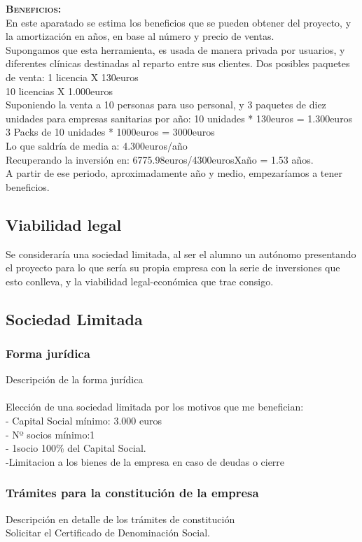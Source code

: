 \textbf{\textsc{Beneficios:}}\\
En este aparatado se estima los beneficios que se pueden obtener del proyecto, y la amortización en años, en base al número y precio de ventas.\\
Supongamos que esta herramienta, es usada de manera privada por usuarios, y diferentes clínicas destinadas al reparto entre sus clientes.
Dos posibles paquetes de venta:
1 licencia X 130euros\\
10 licencias X 1.000euros\\
Suponiendo la venta a 10 personas para uso personal, y 3 paquetes de diez unidades para empresas sanitarias por año:
10 unidades * 130euros = 1.300euros\\
3 Packs de 10 unidades * 1000euros = 3000euros\\
Lo que saldría de media a: 4.300euros/año\\
Recuperando la inversión en: 6775.98euros/4300eurosXaño = 1.53 años.\\
A partir de ese periodo, aproximadamente año y medio, empezaríamos a tener beneficios.

\subsection{Viabilidad legal}
Se consideraría una sociedad limitada, al ser el alumno un autónomo presentando el proyecto para lo que sería su propia empresa con la serie de inversiones que esto conlleva, y la viabilidad legal-económica que trae consigo.
\subsection{Sociedad Limitada}
\subsubsection{Forma jurídica}
Descripción de la forma jurídica\\
\\
Elección de una sociedad limitada por los motivos que me benefician:\\
- Capital Social mínimo: 3.000 euros  \\

- Nº socios mínimo:1 \\
- 1socio 100\% del Capital Social.\\
-Limitacion a los bienes de la empresa en caso de deudas o cierre \\
\subsubsection{Trámites para la constitución de la empresa}
Descripción en detalle de los trámites de constitución\\
Solicitar el Certificado de Denominación Social.\\

